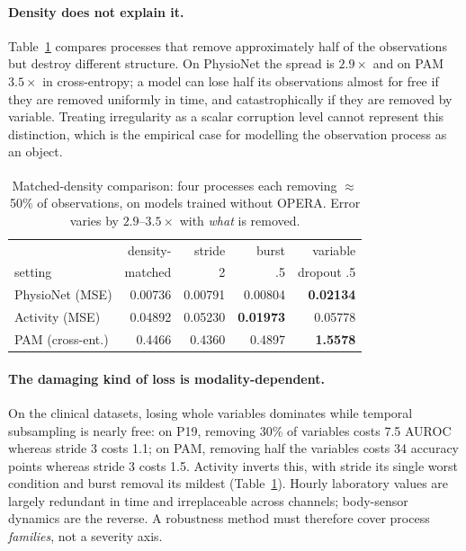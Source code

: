 \documentclass[sigconf,nonacm]{acmart}
\newcommand{\prelim}{\textsuperscript{\dag}}
\begin{document}
\paragraph{Density does not explain it.}
Table~\ref{tab:density} compares processes that remove approximately half of the observations but destroy
different structure. On PhysioNet the spread is $2.9\times$ and on PAM $3.5\times$ in cross-entropy; a model can
lose half its observations almost for free if they are removed uniformly in time, and catastrophically if they
are removed by variable. Treating irregularity as a scalar corruption level cannot represent this distinction,
which is the empirical case for modelling the observation process as an object.

\begin{table}[t]
\caption{Matched-density comparison\prelim: four processes each removing $\approx$50\% of observations, on
models trained without OPERA. Error varies by $2.9$--$3.5\times$ with \emph{what} is removed.}
\label{tab:density}
\small
\begin{tabular}{lrrrr}
\toprule
 & density- & stride & burst & variable \\
setting & matched & 2 & .5 & dropout .5 \\
\midrule
PhysioNet (MSE) & 0.00736 & 0.00791 & 0.00804 & \textbf{0.02134} \\
Activity (MSE) & 0.04892 & 0.05230 & \textbf{0.01973} & 0.05778 \\
PAM (cross-ent.) & 0.4466 & 0.4360 & 0.4897 & \textbf{1.5578} \\
\bottomrule
\end{tabular}
\end{table}

\paragraph{The damaging kind of loss is modality-dependent.}
On the clinical datasets, losing whole variables dominates while temporal subsampling is nearly free: on P19,
removing 30\% of variables costs 7.5 AUROC whereas stride 3 costs 1.1; on PAM, removing half the variables costs
34 accuracy points whereas stride 3 costs 1.5. Activity inverts this, with stride its single worst condition and
burst removal its mildest (Table~\ref{tab:density}). Hourly laboratory values are largely redundant in time and
irreplaceable across channels; body-sensor dynamics are the reverse. A robustness method must therefore cover
process \emph{families}, not a severity axis.
\end{document}
